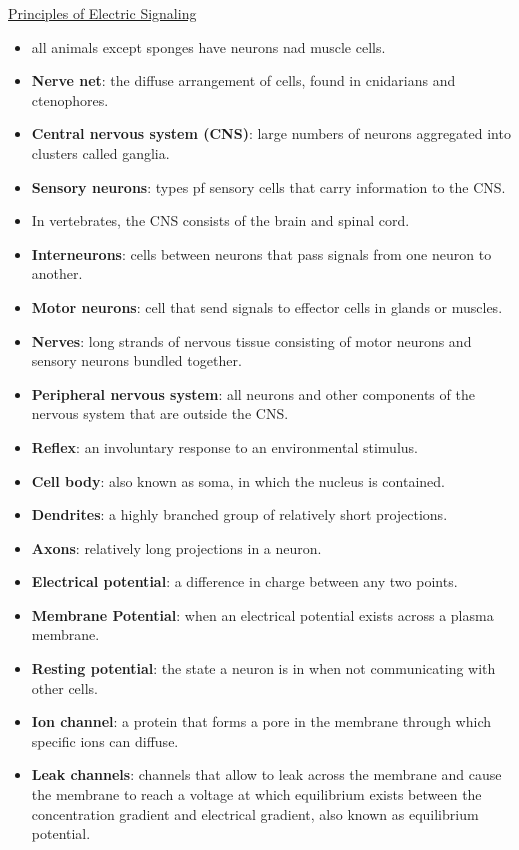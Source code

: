 \documentclass[12pt,letterpaper]{article}
\begin{document}
\hypertarget{43.1}{}
\begin{secbox}{\hyperlink{43}{Principles of Electric Signaling}}{
    \begin{itemize}
        \item all animals except sponges have neurons nad muscle cells.
        \item \textbf{Nerve net}: the diffuse arrangement of cells, found in cnidarians and ctenophores.
        \item \textbf{Central nervous system (CNS)}: large numbers of neurons aggregated into clusters called ganglia.
        \item \textbf{Sensory neurons}: types pf sensory cells that carry information to the CNS. 
        \item In vertebrates, the CNS consists of the brain and spinal cord.
        \item \textbf{Interneurons}: cells between neurons that pass signals from one neuron to another.
        \item \textbf{Motor neurons}: cell that send signals to effector cells in glands or muscles.
        \item \textbf{Nerves}: long strands of nervous tissue consisting of motor neurons and sensory neurons bundled together.
        \item \textbf{Peripheral nervous system}: all neurons and other components of the nervous system that are outside the CNS.
        \item \textbf{Reflex}: an involuntary response to an environmental stimulus. 
        \item \textbf{Cell body}: also known as soma, in which the nucleus is contained.
        \item \textbf{Dendrites}: a highly branched group of relatively short projections.
        \item \textbf{Axons}: relatively long projections in a neuron.
        \item \textbf{Electrical potential}: a difference in charge between any two points.
        \item \textbf{Membrane Potential}: when an electrical potential exists across a plasma membrane.
        \item \textbf{Resting potential}: the state a neuron is in when not communicating with other cells.
        \item \textbf{Ion channel}: a protein that forms a pore in the membrane through which specific ions can diffuse.
        \item \textbf{Leak channels}: channels that allow  to leak across the membrane and cause the membrane to reach a voltage at which equilibrium exists between the concentration gradient and electrical gradient, also known as equilibrium potential. 

\end{itemize}}
\end{secbox}
\end{document}
